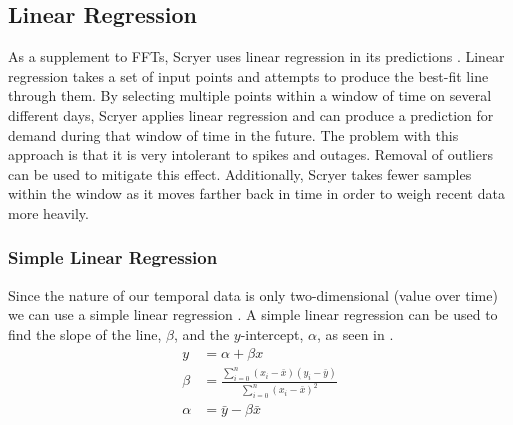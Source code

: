 \subsection{Linear Regression}
\label{sec:regression}
As a supplement to FFTs, Scryer uses linear regression \cite{statistics} in its predictions \cite{scryer}. Linear regression takes a set of input points and attempts to produce the best-fit line through them. By selecting multiple points within a window of time on several different days, Scryer applies linear regression and can produce a prediction for demand during that window of time in the future. The problem with this approach is that it is very intolerant to spikes and outages. Removal of outliers can be used to mitigate this effect. Additionally, Scryer takes fewer samples within the window as it moves farther back in time in order to weigh recent data more heavily.

\subsubsection{Simple Linear Regression}
\label{sec:slr}
Since the nature of our temporal data is only two-dimensional (value over time) we can use a simple linear regression \cite{statistics}. A simple linear regression can be used to find the slope of the line, $\beta$, and the $y$-intercept, $\alpha$, as seen in .
%
\begin{equation}
\label{eq:line}
\begin{split}
y& = \alpha + \beta x \\
\beta& = \frac{\sum_{i=0}^{n}(x_i - \bar{x})(y_i - \bar{y})}{\sum_{i=0}^{n}(x_i - \bar{x})^2} \\
\alpha& = \bar{y} - \beta \bar{x} \\
\end{split}
\end{equation}

